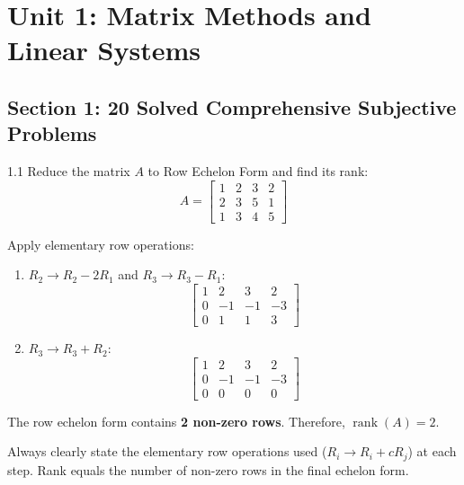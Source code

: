 \chapter{Unit 1: Matrix Methods and Linear Systems}

\section{Section 1: 20 Solved Comprehensive Subjective Problems}

\begin{subjectiveq}{1.1}
Reduce the matrix $A$ to Row Echelon Form and find its rank:
\begin{equation}
A = \begin{bmatrix}
1 & 2 & 3 & 2 \\
2 & 3 & 5 & 1 \\
1 & 3 & 4 & 5
\end{bmatrix}
\end{equation}
\end{subjectiveq}

\begin{solbox}
Apply elementary row operations:
\begin{enumerate}
    \item $R_2 \to R_2 - 2R_1$ and $R_3 \to R_3 - R_1$:
    \begin{equation}
    \begin{bmatrix}
    1 & 2 & 3 & 2 \\
    0 & -1 & -1 & -3 \\
    0 & 1 & 1 & 3
    \end{bmatrix}
    \end{equation}
    \item $R_3 \to R_3 + R_2$:
    \begin{equation}
    \begin{bmatrix}
    1 & 2 & 3 & 2 \\
    0 & -1 & -1 & -3 \\
    0 & 0 & 0 & 0
    \end{bmatrix}
    \end{equation}
\end{enumerate}
The row echelon form contains \textbf{2 non-zero rows}. Therefore, $\operatorname{rank}(A) = 2$.
\end{solbox}

\begin{examinertip}
Always clearly state the elementary row operations used ($R_i \to R_i + c R_j$) at each step. Rank equals the number of non-zero rows in the final echelon form.
\end{examinertip}

